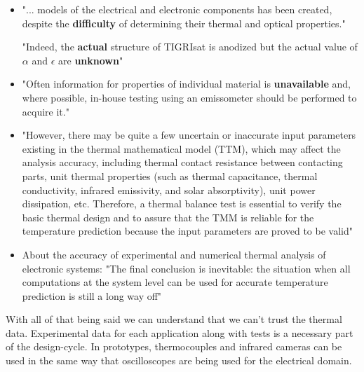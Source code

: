 \documentclass[final]{cubedoc}
\begin{document}
	\begin{itemize}
		\item "... models of the electrical and electronic components has been created, despite the \textbf{difficulty} of determining their thermal and optical properties." 
		
		"Indeed, the \textbf{actual} structure of TIGRIsat is anodized but the actual value of $\alpha$  and $\epsilon$ are \textbf{unknown}" \cite{paris2015}
		\item "Often information for properties of individual material is \textbf{unavailable} and, where possible, in-house testing using an emissometer should be performed to acquire it." \cite{mccarron2018developing}
		
		
		\item "However, there may be quite a few uncertain or inaccurate input parameters existing in the thermal mathematical model (TTM), which may affect the analysis accuracy, including thermal contact resistance between contacting parts, unit thermal properties (such as thermal capacitance, thermal conductivity, infrared emissivity, and solar absorptivity), unit power dissipation, etc. Therefore, a thermal balance test is essential to verify the basic thermal design and to assure that the TMM is reliable for the temperature prediction because the input parameters are proved to be valid" \cite{tsai2004overview}
		
		
		
		\item About the accuracy of experimental and numerical thermal analysis of electronic systems: "The final conclusion is inevitable: the situation when all computations at the system level can be used for accurate temperature prediction is still a long way off" \cite{lasance2002}
	\end{itemize}
	
	With all of that being said we can understand that we can't trust the thermal data. Experimental data for each application along with tests is a necessary part of the design-cycle. In prototypes, thermocouples and infrared cameras can be used in the same way that oscilloscopes are being used for the electrical domain.
	
\end{document}
